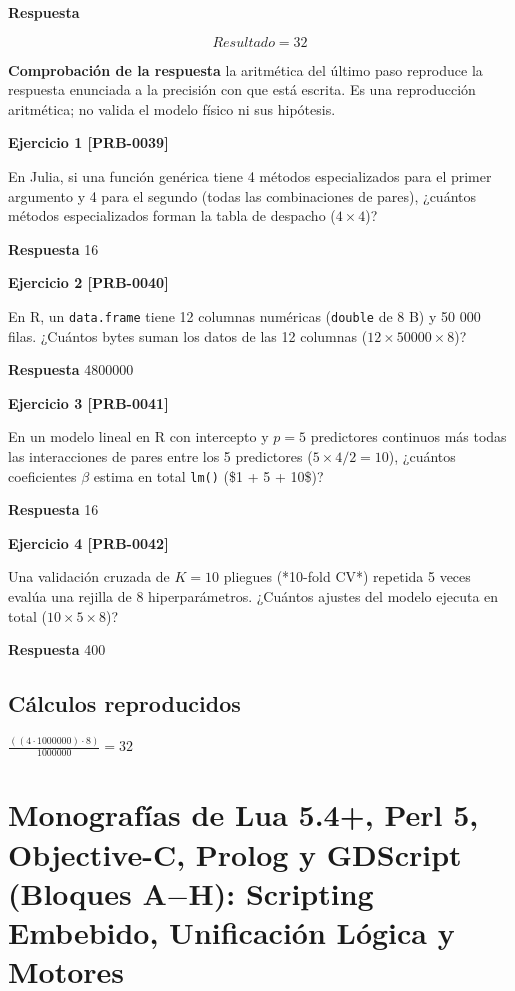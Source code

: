 \documentclass{book}
\begin{document}
\noindent\textbf{Respuesta}

\[
Resultado = 32
\]

\noindent\textbf{Comprobación de la respuesta} la aritmética del último paso reproduce la respuesta enunciada a la precisión con que está escrita. Es una reproducción aritmética; no valida el modelo físico ni sus hipótesis.

\noindent\textbf{Ejercicio 1 [PRB-0039]}

En Julia, si una función genérica tiene 4 métodos especializados para el primer argumento y 4 para el segundo (todas las combinaciones de pares), ¿cuántos métodos especializados forman la tabla de despacho (\(4 \times 4\))?

\noindent\textbf{Respuesta} 16

\noindent\textbf{Ejercicio 2 [PRB-0040]}

En R, un \texttt{data.frame} tiene 12 columnas numéricas (\texttt{double} de 8 B) y 50 000 filas. ¿Cuántos bytes suman los datos de las 12 columnas (\(12 \times 50000 \times 8\))?

\noindent\textbf{Respuesta} 4800000

\noindent\textbf{Ejercicio 3 [PRB-0041]}

En un modelo lineal en R con intercepto y \(p = 5\) predictores continuos más todas las interacciones de pares entre los 5 predictores (\(5 \times 4 / 2 = 10\)), ¿cuántos coeficientes \(\beta\) estima en total \texttt{lm()} (\$1 + 5 + 10\$)?

\noindent\textbf{Respuesta} 16

\noindent\textbf{Ejercicio 4 [PRB-0042]}

Una validación cruzada de \(K = 10\) pliegues (*10-fold CV*) repetida 5 veces evalúa una rejilla de 8 hiperparámetros. ¿Cuántos ajustes del modelo ejecuta en total (\(10 \times 5 \times 8\))?

\noindent\textbf{Respuesta} 400

\subsection*{Cálculos reproducidos}

\(\frac{\left(\left(4\cdot 1000000\right)\cdot 8\right)}{1000000} = 32\)

\section{Monografías de Lua 5.4+, Perl 5, Objective-C, Prolog y GDScript (Bloques A\(-\)H): Scripting Embebido, Unificación Lógica y Motores}
\end{document}
